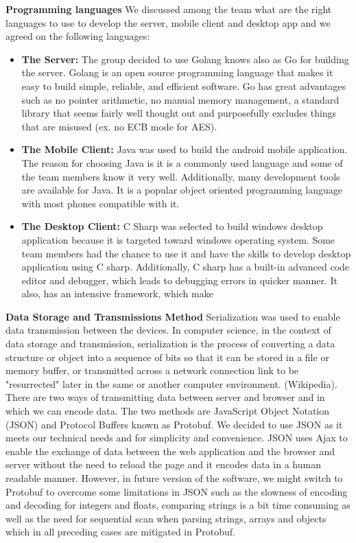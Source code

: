 \documentclass{article}
\begin{document}
\hfill \break
\textbf{Programming languages}
We discussed among the team what are the right languages to use to develop the server, mobile client and desktop app and we agreed on the following languages:
\begin{itemize}
\item\textbf{The Server:} The group decided to use Golang knows also as Go for building the server. Golang is an open source programming language that makes it easy to build simple, reliable, and efficient software. Go has great advantages such as no pointer arithmetic, no manual memory management, a standard library that seems fairly well thought out and purposefully excludes things that are misused (ex. no ECB mode for AES).
\item\textbf{The Mobile Client:} Java was used to build the android mobile application. The reason for choosing Java is it is a commonly used language and some of the team members know it very well.
Additionally, many development tools are available for Java. It is a popular object oriented programming language with most phones compatible with it.
\item\textbf{The Desktop Client:} C Sharp was selected to build windows desktop application because it is targeted toward windows operating system. Some team members had the chance to use it and have the skills to develop desktop application using C sharp. Additionally, C sharp has a built-in advanced code editor and debugger, which leads to debugging errors in quicker manner. It also, has an intensive framework, which make
\end{itemize}

\hfill \break
\textbf{Data Storage and Transmissions Method}
Serialization was used to enable data transmission between the devices. In computer science, in the context of data storage and transmission, serialization is the process of converting a data structure or object into a sequence of bits so that it can be stored in a file or memory buffer, or transmitted across a network connection link to be "resurrected" later in the same or another computer environment. (Wikipedia). There are two ways of transmitting data between server and browser and in which we can encode data. The two methods are JavaScript Object Notation
(JSON) and Protocol Buffers known as Protobuf. We decided to use JSON as it meets our technical needs and for simplicity and convenience. JSON uses Ajax to enable the exchange of data between the web application and the browser and server without the need to reload the page and it encodes data in a human readable manner. However, in future version of the software, we might switch to Protobuf to overcome some limitations in JSON such as the slowness of encoding and decoding for integers and floats, comparing strings is a bit time consuming as well as the need for sequential scan when parsing strings, arrays and objects which in all preceding cases are mitigated in Protobuf.
\end{document}
